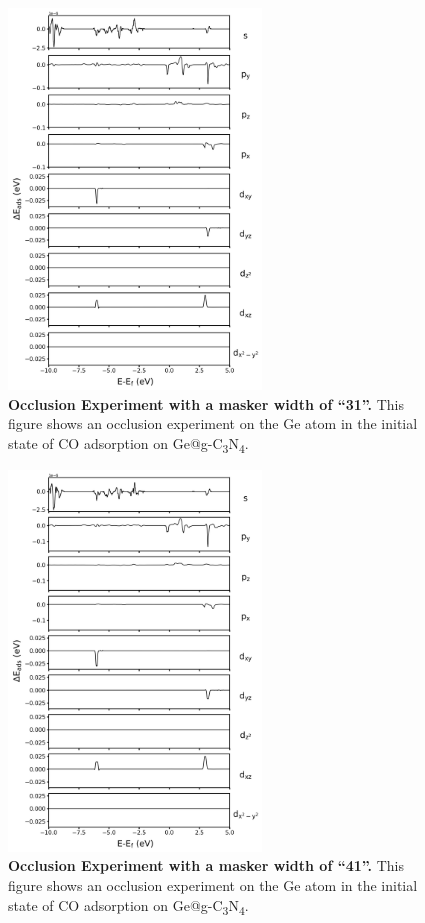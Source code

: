 \begin{figure}[htbp]
  \centering
  \includegraphics[width=0.6\textwidth]{supp_fig27_occl_wid31.png}
  \caption{\textbf{Occlusion Experiment with a masker width of ``31''.}
  This figure shows an occlusion experiment on the Ge atom in
  the initial state of CO adsorption on Ge@g-C\textsubscript{3}N\textsubscript{4}.}
  \label{supp_fig27:occl_wid31}
\end{figure}

\begin{figure}[htbp]
  \centering
  \includegraphics[width=0.6\textwidth]{supp_fig28_occl_wid41.png}
  \caption{\textbf{Occlusion Experiment with a masker width of ``41''.}
  This figure shows an occlusion experiment on the Ge atom in
  the initial state of CO adsorption on Ge@g-C\textsubscript{3}N\textsubscript{4}.}
  \label{supp_fig28:occl_wid41}
\end{figure}

